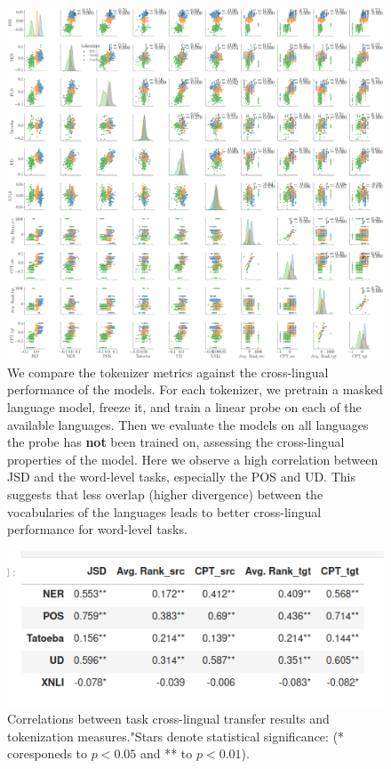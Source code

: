 \begin{figure}[H]
    \centering
    \includegraphics[width=\textwidth]{img/temp/X_pair_analysis_20L.png}
    \caption{We compare the tokenizer metrics against the cross-lingual performance of the models. For each tokenizer, we pretrain a masked language model, freeze it, and train a linear probe on each of the available languages. Then we evaluate the models on all languages the probe has \textbf{not} been trained on, assessing the cross-lingual properties of the model. Here we observe a high correlation between JSD and the word-level tasks, especially the POS and UD. This suggests that less overlap (higher divergence) between the vocabularies of the languages leads to better cross-lingual performance for word-level tasks.
    } 
    \label{fig:X_pair_analysis_20L}
\end{figure}



\begin{figure}[H]
    \centering
    \includegraphics[width=\textwidth]{img/temp/corr_x_lang_20l.png}
    \caption{Correlations between task cross-lingual transfer results and tokenization measures."Stars denote statistical significance: (* coresponeds to $p<0.05$ and ** to $p<0.01$).}
    \label{fig:corr_x_lang_20l}
\end{figure}

